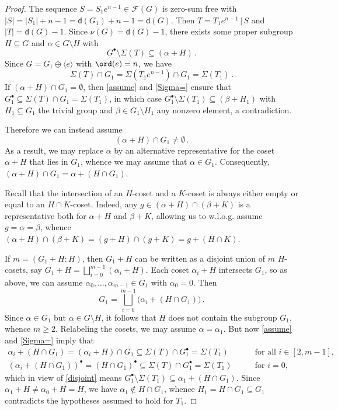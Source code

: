 \documentclass[a4paper, 10pt]{amsart}
\theoremstyle{plain}
\theoremstyle{definition}
\renewcommand{\t}{\, | \,}
\renewcommand{\t}{\, | \,}
\numberwithin{equation}{section}
\begin{document}
{\begin{proof}
The sequence  $S=S_1e^{n-1} \in \mathcal F (G)$ is zero-sum free with $|S|=|S_1|+n-1=\mathsf d(G_1)+n-1=\mathsf d(G)$. Then $T = T_1e^{n-1} \t S$ and $|T| = \mathsf d (G)-1$.  Since $\nu (G) = \mathsf d (G)-1$, there exists some proper subgroup $H \subseteq G$ and $\alpha\in G\setminus H$ with 
\begin{equation} \label{assume} 
G^{\bullet} \setminus \Sigma (T)  \subseteq (\alpha+H) \,.
\end{equation}
Since $G=G_1\oplus \langle e\rangle$ with $\ord(e)=n$, we have  
\begin{equation} \label{Sigma=}
\Sigma (T)\cap G_1=\Sigma (T_1e^{n-1})\cap G_1=\Sigma (T_1) \,.
\end{equation}
If $(\alpha+H)\cap G_1=\emptyset$, then \eqref{assume} and \eqref{Sigma=} ensure that $G_1^{\bullet} \subseteq \Sigma (T)\cap G_1=\Sigma (T_1)$, in which case   $G_1^{\bullet} \setminus \Sigma (T_1) \subseteq (\beta+H_1)$ with $H_1 \subseteq G_1$ the trivial group and $\beta\in G_1\setminus H_1$ any nonzero element, a contradiction. 

Therefore we can instead assume 
\[
(\alpha+H)\cap G_1\neq \emptyset \,.
\]
As a result, we may replace $\alpha$ by an alternative representative for the coset $\alpha+H$ that lies in $G_1$, whence we may  assume that $\alpha\in G_1$. Consequently, $(\alpha+H)\cap G_1=\alpha+(H\cap G_1)$.

Recall that the intersection of an $H$-coset and a $K$-coset is always either empty or equal to an $H\cap K$-coset. 
Indeed, any $g\in (\alpha+H)\cap (\beta+K)$ is a representative both for $\alpha+H$ and $\beta+K$, allowing us to w.l.o.g. assume $g=\alpha=\beta$, whence $(\alpha+H)\cap (\beta+K)=(g+H)\cap (g+K)=g+(H\cap K)$.

If $m= (G_1+H:H)$, then
 $G_1+H$ can be written as a disjoint union of $m$ $H$-cosets, say $G_1+H=\bigsqcup_{i=0}^{m-1}(\alpha_i+H)$. Each coset $\alpha_i+H$ intersects $G_1$, so as above, we can  assume $\alpha_0,\ldots,\alpha_{m-1}\in G_1$ with $\alpha_0=0$. Then  
\begin{equation} \label{disjoint}
G_1=\bigsqcup_{i=0}^{m-1}\Big(\alpha_i+(H\cap G_1)\Big) \,.
\end{equation}
Since $\alpha\in G_1$ but $\alpha\in G\setminus H$, it follows that $H$ does not contain the subgroup $G_1$, whence  $m\geq 2$. Relabeling the cosets, we may assume $\alpha=\alpha_1$. But now \eqref{assume} and \eqref{Sigma=} imply that 
\begin{align*}
			\alpha_i + (H \cap G_1) = (\alpha_i + H) \cap G_1 \subseteq \Sigma (T) \cap G_1^{\bullet} = \Sigma (T_1)
			\qquad &\text{for all } i \in  [2, m-1],\\
			(\alpha_i + (H \cap G_1))^{\bullet} = (H \cap G_1)^{\bullet} \subseteq \Sigma (T) \cap G_1^{\bullet} = \Sigma (T_1)
			\qquad &\text{for } i =0,
\end{align*}
which in view of \eqref{disjoint} means $G_1^{\bullet} \setminus \Sigma (T_1) \subseteq \alpha_1+(H\cap G_1)$. Since $\alpha_1+H\neq \alpha_0+H=H$, we have $\alpha_1\notin H\cap G_1$, whence  $H_1 =H\cap G_1 \subseteq G_1$ contradicts the hypotheses assumed to hold for $T_1$. 
\end{proof}

}
\end{document}
